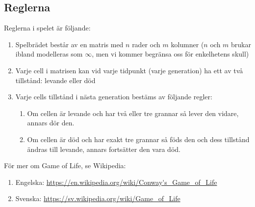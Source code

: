 


\subsection{Reglerna}

Reglerna i spelet är följande:

\begin{enumerate}
    \item Spelbrädet består av en matris med $n$ rader och $m$ kolumner ($n$ och $m$ brukar ibland modelleras som $\infty$, men vi kommer begränsa oss för enkelhetens skull)
    \item Varje cell i matrisen kan vid varje tidpunkt (varje generation) ha ett av två tillstånd: levande eller död
    \item Varje cells tillstånd i nästa generation bestäms av följande regler:
        \begin{enumerate}
            \item Om cellen är levande och har två eller tre grannar så lever den vidare, annars dör den.
            \item Om cellen är död och har exakt tre grannar så föds den och dess tillstånd ändras till levande, annars fortsätter den vara död.
        \end{enumerate}
\end{enumerate}


För mer om Game of Life, se Wikipedia:

\begin{enumerate}
    \item Engelska: \url{https://en.wikipedia.org/wiki/Conway's_Game_of_Life}
    \item Svenska: \url{https://sv.wikipedia.org/wiki/Game_of_Life}
\end{enumerate}


